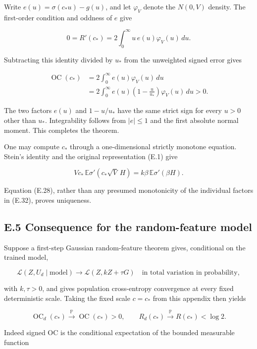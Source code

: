 \documentclass[
  11pt,
  a4paper,
]{article}
\begin{document}
Write \(e(u)=\sigma(c_*u)-g(u)\), and let \(\varphi_V\) denote the
\(N(0,V)\) density. The first-order condition and oddness of \(e\) give

\[
0=R'(c_*)=2\int_0^\infty u\,e(u)\varphi_V(u)\,du.
\tag{E.30}
\]

Subtracting this identity divided by \(u_*\) from the unweighted signed
error gives

\[
\begin{aligned}
\operatorname{OC}(c_*)
&=2\int_0^\infty e(u)\varphi_V(u)\,du\\
&=2\int_0^\infty e(u)
    \left(1-\frac u{u_*}\right)\varphi_V(u)\,du
>0.
\end{aligned}
\tag{E.31}
\]

The two factors \(e(u)\) and \(1-u/u_*\) have the same strict sign for
every \(u>0\) other than \(u_*\). Integrability follows from \(|e|\le1\)
and the first absolute normal moment. This completes the theorem.

One may compute \(c_*\) through a one-dimensional strictly monotone
equation. Stein's identity and the original representation (E.1) give

\[
Vc_*\,\mathbb E\sigma'(c_*\sqrt V\,H)
=k\beta\,\mathbb E\sigma'(\beta H).
\tag{E.32}
\]

Equation (E.28), rather than any presumed monotonicity of the individual
factors in (E.32), proves uniqueness.

\hypertarget{e.5-consequence-for-the-random-feature-model}{%
\subsection{E.5 Consequence for the random-feature
model}\label{e.5-consequence-for-the-random-feature-model}}

Suppose a first-step Gaussian random-feature theorem gives, conditional
on the trained model,

\[
\mathcal L(Z,U_d\mid\text{model})
\longrightarrow \mathcal L(Z,kZ+\tau G)
\quad\text{in total variation in probability},
\tag{E.33}
\]

with \(k,\tau>0\), and gives population cross-entropy convergence at
every fixed deterministic scale. Taking the fixed scale \(c=c_*\) from
this appendix then yields

\[
\operatorname{OC}_d(c_*)\xrightarrow{\mathbb P}
\operatorname{OC}(c_*)>0,\qquad
R_d(c_*)\xrightarrow{\mathbb P}R(c_*)<\log2.
\tag{E.34}
\]

Indeed signed OC is the conditional expectation of the bounded
measurable function
\end{document}
